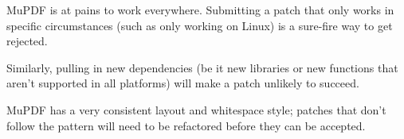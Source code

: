 \documentclass[oneside]{book}
\begin{document}
MuPDF is at pains to work everywhere. Submitting a patch that only works in specific circumstances (such as only working on Linux) is a sure-fire way to get rejected.

Similarly, pulling in new dependencies (be it new libraries or new functions that aren't supported in all platforms) will make a patch unlikely to succeed.

MuPDF has a very consistent layout and whitespace style; patches that don't follow the pattern will need to be refactored before they can be accepted.

\backmatter
\printindex
\end{document}
